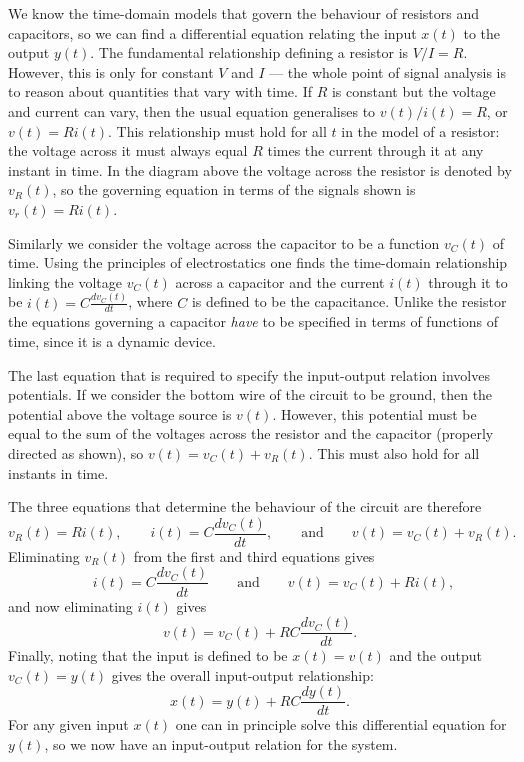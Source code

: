 \documentclass[10pt]{beamer}
\begin{document}
We know the time-domain models that govern the behaviour of resistors and capacitors, so we can find a differential equation relating the input $x(t)$ to the output $y(t)$.  The fundamental relationship defining a resistor is $V/I=R$.  However, this is only for constant $V$ and $I$ --- the whole point of signal analysis is to reason about quantities that vary with time.  If $R$ is constant but the voltage and current can vary, then the usual equation generalises to $v(t)/i(t) = R$, or $v(t) = R i(t)$.  This relationship must hold for all $t$ in the model of a resistor:  the voltage across it must always equal $R$ times the current through it at any instant in time.  In the diagram above the voltage across the resistor is denoted by $v_R(t)$, so the governing equation in terms of the signals shown is $v_r(t) = R i(t)$.

Similarly we consider the voltage across the capacitor to be a function $v_C(t)$ of time.  Using the principles of electrostatics one finds the time-domain relationship linking the voltage $v_C(t)$ across a capacitor and the current $i(t)$ through it to be $i(t) = C \frac{dv_C(t)}{dt}$, where $C$ is defined to be the capacitance.  Unlike the resistor the equations governing a capacitor {\em have} to be specified in terms of functions of time, since it is a dynamic device.

The last equation that is required to specify the input-output relation involves potentials.  If we consider the bottom wire of the circuit to be ground, then the potential above the voltage source is $v(t)$.  However, this potential must be equal to the sum of the voltages across the resistor and the capacitor (properly directed as shown), so $v(t) = v_C(t) + v_R(t)$.  This must also hold for all instants in time.

The three equations that determine the behaviour of the circuit are therefore
\begin{equation*}
  v_R(t) = R i(t), \qquad i(t) = C \frac{dv_C(t)}{dt}, \qquad \text{and} \qquad v(t) = v_C(t) + v_R(t).
\end{equation*}
Eliminating $v_R(t)$ from the first and third equations gives
\begin{equation*}
  \qquad i(t) = C \frac{dv_C(t)}{dt} \qquad \text{and} \qquad v(t) = v_C(t) + R i(t),
\end{equation*}
and now eliminating $i(t)$ gives
\begin{equation*}
  v(t) = v_C(t) + R C \frac{dv_C(t)}{dt}.
\end{equation*}
Finally, noting that the input is defined to be $x(t) = v(t)$ and the output $v_C(t) = y(t)$ gives the overall input-output relationship:
\begin{equation*}
  x(t) = y(t) + R C \frac{dy(t)}{dt}.
\end{equation*}
For any given input $x(t)$ one can in principle solve this differential equation for $y(t)$, so we now have an input-output relation for the system.
\end{document}
